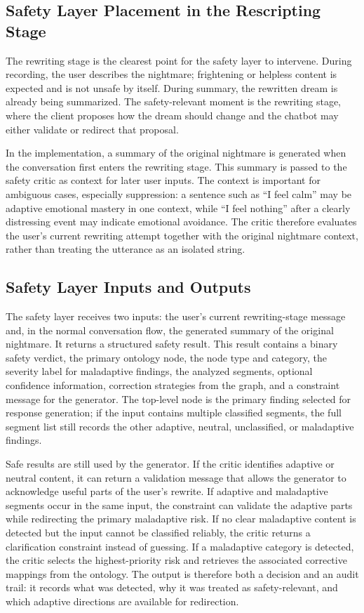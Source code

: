\subsection{Safety Layer Placement in the Rescripting Stage}

The rewriting stage is the clearest point for the safety layer to intervene. During recording, the user describes the nightmare; frightening or helpless content is expected and is not unsafe by itself. During summary, the rewritten dream is already being summarized. The safety-relevant moment is the rewriting stage, where the client proposes how the dream should change and the chatbot may either validate or redirect that proposal.

In the implementation, a summary of the original nightmare is generated when the conversation first enters the rewriting stage. This summary is passed to the safety critic as context for later user inputs. The context is important for ambiguous cases, especially suppression: a sentence such as ``I feel calm'' may be adaptive emotional mastery in one context, while ``I feel nothing'' after a clearly distressing event may indicate emotional avoidance. The critic therefore evaluates the user's current rewriting attempt together with the original nightmare context, rather than treating the utterance as an isolated string.

\subsection{Safety Layer Inputs and Outputs}

The safety layer receives two inputs: the user's current rewriting-stage message and, in the normal conversation flow, the generated summary of the original nightmare. It returns a structured safety result. This result contains a binary safety verdict, the primary ontology node, the node type and category, the severity label for maladaptive findings, the analyzed segments, optional confidence information, correction strategies from the graph, and a constraint message for the generator. The top-level node is the primary finding selected for response generation; if the input contains multiple classified segments, the full segment list still records the other adaptive, neutral, unclassified, or maladaptive findings.

Safe results are still used by the generator. If the critic identifies adaptive or neutral content, it can return a validation message that allows the generator to acknowledge useful parts of the user's rewrite. If adaptive and maladaptive segments occur in the same input, the constraint can validate the adaptive parts while redirecting the primary maladaptive risk. If no clear maladaptive content is detected but the input cannot be classified reliably, the critic returns a clarification constraint instead of guessing. If a maladaptive category is detected, the critic selects the highest-priority risk and retrieves the associated corrective mappings from the ontology. The output is therefore both a decision and an audit trail: it records what was detected, why it was treated as safety-relevant, and which adaptive directions are available for redirection.

